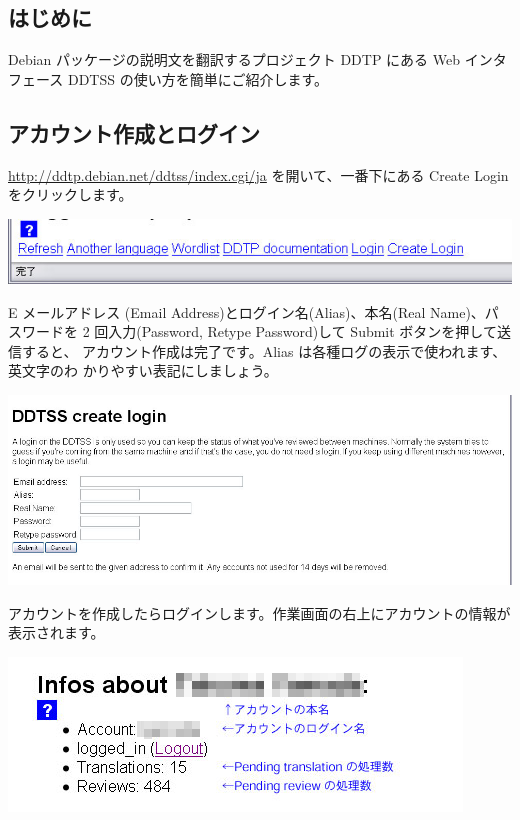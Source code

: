 \documentclass[mingoth,a4paper]{jsarticle}
\begin{document}

\subsection{はじめに}
Debian パッケージの説明文を翻訳するプロジェクト DDTP にある Web インタ
フェース DDTSS の使い方を簡単にご紹介します。

\subsection{アカウント作成とログイン}

\url{http://ddtp.debian.net/ddtss/index.cgi/ja} を開いて、一番下にある Create
Login をクリックします。

  \includegraphics[scale=0.7]{image200906/ddtss129.jpg}

E メールアドレス (Email Address)とログイン名(Alias)、本名(Real Name)、パスワードを 2
回入力(Password, Retype Password)して Submit ボタンを押して送信すると、
アカウント作成は完了です。Alias は各種ログの表示で使われます、英文字のわ
かりやすい表記にしましょう。

  \includegraphics[scale=0.7]{image200906/ddtss141.jpg}

アカウントを作成したらログインします。作業画面の右上にアカウントの情報が表示されます。

  \includegraphics[scale=0.7]{image200906/ddtss130.jpg}
\end{document}
